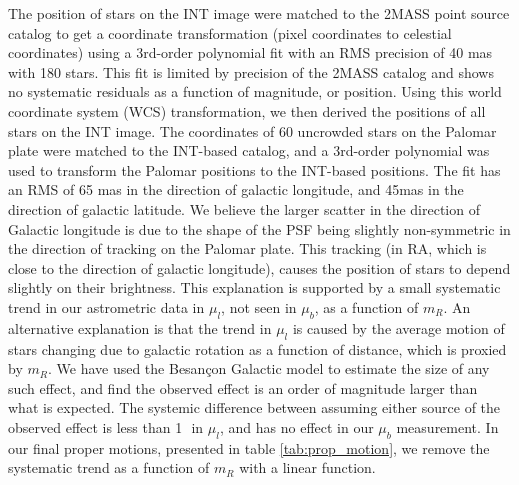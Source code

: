 The position of stars on the INT image were matched to
the 2MASS point source catalog \citep{2006AJ....131.1163S} to get a coordinate 
transformation (pixel coordinates to celestial coordinates) using a
3rd-order polynomial fit with an RMS precision of 40 mas with 180 stars. This fit is limited by precision of the 2MASS catalog and shows no systematic residuals as a function of magnitude, or position.  Using this  world coordinate system (WCS) transformation, we then derived the
positions of all stars on the INT image. The coordinates of 60 uncrowded
stars on the Palomar plate were matched to the INT-based catalog, and a 3rd-order polynomial was used to transform the Palomar positions to the INT-based positions. The fit has an RMS of 65 mas in the direction of galactic longitude, and 45mas in the direction of galactic latitude.  We believe the larger scatter in the direction of  Galactic longitude is due to the shape of the PSF being slightly non-symmetric in the direction of tracking on the Palomar plate. This tracking (in RA, which is close to the direction of galactic longitude), causes the position of stars to depend slightly on their brightness. This explanation is supported by  a small systematic trend in our astrometric data in $\mu_l$, not seen in $\mu_b$, as a function of $m_R$.  An alternative explanation is that the  trend in $\mu_l$ is caused by the average motion of stars changing due to galactic rotation as a function of distance, which is proxied by $m_R$.  We have used the Besan\c{c}on Galactic model \citep{2003A&A...409..523R} to estimate the size of any such effect, and find the observed effect is an order of magnitude larger than what is expected. The systemic difference between assuming either source of the observed effect is less than 1\,\masyr\ in $\mu_l$, and has no effect in our $\mu_b$ measurement. In our final proper motions, presented in table \ref{tab:prop_motion}, we remove  the systematic trend as a function of $m_R$ with a linear function.


